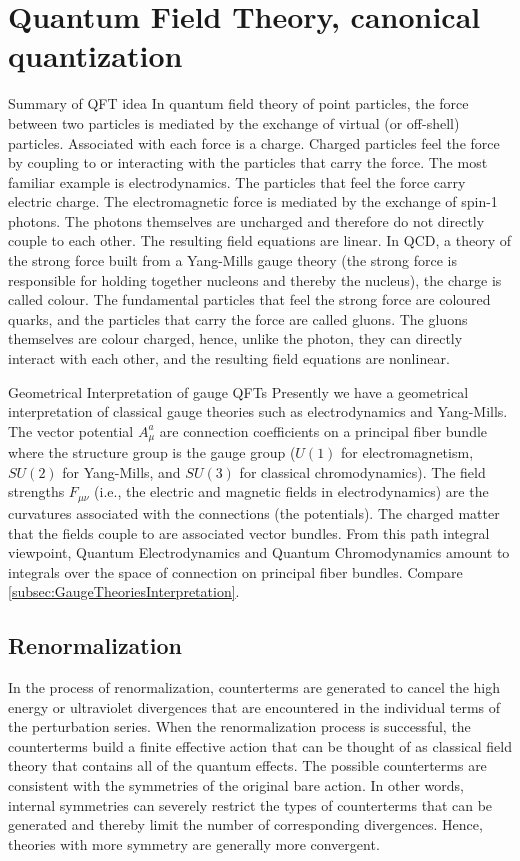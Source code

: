 
\chapter{Quantum Field Theory, canonical quantization}
\begin{mybox}{Summary of QFT idea}
	In quantum field theory of point particles, the force between two particles is mediated by the exchange of virtual (or off-shell) particles. Associated with each force is a charge. Charged particles feel the force by coupling to or interacting with the particles that carry the force. The most familiar example is electrodynamics. The particles that feel the force carry electric charge. The electromagnetic force is mediated by the exchange of spin-1 photons. The photons themselves are uncharged and therefore do not directly couple to each other. The resulting field equations are linear. In QCD, a theory of the strong force built from a Yang-Mills gauge theory (the strong force is responsible for holding together nucleons and thereby the nucleus), the charge is called colour. The fundamental particles that feel the strong force are coloured quarks, and the particles that carry the force are called gluons. The gluons themselves are colour charged, hence, unlike the photon, they can directly interact with each other, and the resulting field equations are nonlinear. 
\end{mybox}
\begin{mybox}{Geometrical Interpretation of gauge QFTs}
	Presently we have a geometrical interpretation of classical gauge theories such as electrodynamics and Yang-Mills. The vector potential $A^a_{\mu}$ are connection coefficients on a principal fiber bundle where the structure group is the gauge group ($U(1)$ for electromagnetism, $SU(2)$ for Yang-Mills, and $SU(3)$ for classical chromodynamics). The field strengths $F_{\mu \nu}$ (i.e., the electric and magnetic fields in electrodynamics) are the curvatures associated with the connections (the potentials). The charged matter that the fields couple to are associated vector bundles. From this path integral viewpoint, Quantum Electrodynamics and Quantum Chromodynamics amount to integrals over the space of connection on principal fiber bundles. 
	Compare \ref{subsec:GaugeTheoriesInterpretation}.
\end{mybox}

\section{Renormalization}
In the process of renormalization, counterterms are generated to cancel the high energy or ultraviolet divergences that are encountered in the individual terms of the perturbation series. When the renormalization process is successful, the counterterms build a finite effective action that can be thought of as classical field theory that contains all of the quantum effects. The possible counterterms are consistent with the symmetries of the original bare action. In other words, internal symmetries can severely restrict the types of counterterms that can be generated and thereby limit the number of corresponding divergences. Hence, theories with more symmetry are generally more convergent.
